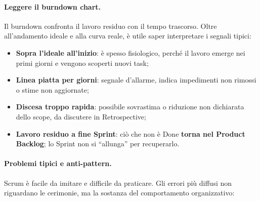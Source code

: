 \documentclass[12pt]{extarticle}
\begin{document}
\paragraph{Leggere il burndown chart.}
Il burndown confronta il lavoro residuo con il tempo trascorso. Oltre all'andamento ideale e alla curva reale, è utile saper interpretare i segnali tipici:
\begin{itemize}
    \item \textbf{Sopra l'ideale all'inizio}: è spesso fisiologico, perché il lavoro emerge nei primi giorni e vengono scoperti nuovi task;
    \item \textbf{Linea piatta per giorni}: segnale d'allarme, indica impedimenti non rimossi o stime non aggiornate;
    \item \textbf{Discesa troppo rapida}: possibile sovrastima o riduzione non dichiarata dello scope, da discutere in Retrospective;
    \item \textbf{Lavoro residuo a fine Sprint}: ciò che non è Done \textbf{torna nel Product Backlog}; lo Sprint non si ``allunga'' per recuperarlo.
\end{itemize}

\paragraph{Problemi tipici e anti-pattern.}
Scrum è facile da imitare e difficile da praticare. Gli errori più diffusi non riguardano le cerimonie, ma la sostanza del comportamento organizzativo:
\end{document}
